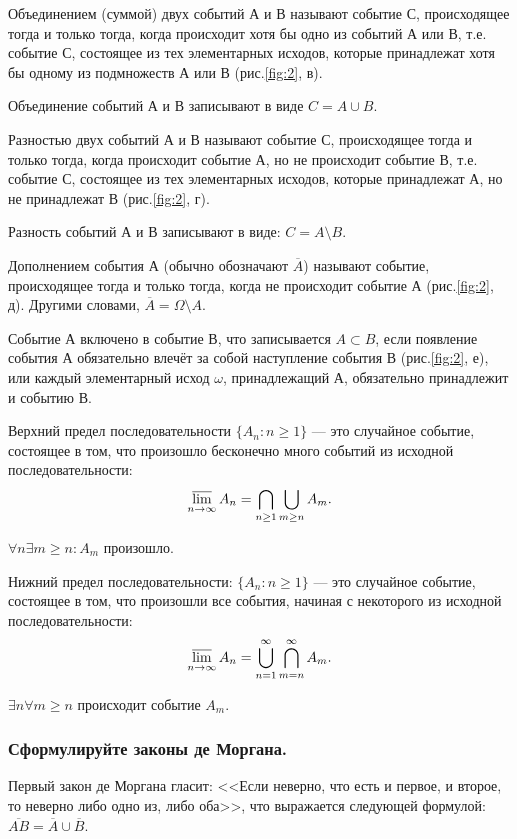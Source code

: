\documentclass{book}
\begin{document}
Объединением (суммой) двух событий А и В называют событие С, происходящее тогда и только тогда, когда происходит хотя бы одно из событий А или В, т.е. событие С, состоящее из тех элементарных исходов, которые принадлежат хотя бы одному из подмножеств А или В (рис.\ref{fig:2}, в).

Объединение событий А и В записывают в виде $C=A\cup B$.

Разностью двух событий А и В называют событие С, происходящее тогда и только тогда, когда происходит событие А, но не происходит событие В, т.е. событие С, состоящее из тех элементарных исходов, которые принадлежат А, но не принадлежат В (рис.\ref{fig:2}, г).

Разность событий А и В записывают в виде: $C=A\setminus B$.

Дополнением события А (обычно обозначают $\overline{A}$) называют событие, происходящее тогда и только тогда, когда не происходит событие А (рис.\ref{fig:2}, д). Другими словами, $\overline{A}=\Omega\setminus A$.

Событие А включено в событие В, что записывается $A\subset B$, если появление события А обязательно влечёт за собой наступление события В (рис.\ref{fig:2}, е), или каждый элементарный исход $\omega$, принадлежащий А, обязательно принадлежит и событию В.

Верхний предел последовательности $\{A_n: n\geq 1\}$ --- это случайное событие, состоящее в том, что произошло бесконечно много событий из исходной последовательности: $$\varlimsup\limits_{n\to\infty}A_n=\bigcap\limits_{n\geq 1}\bigcup\limits_{m\geq n}A_m.$$

$\forall n \exists m\geq n: A_m$ произошло.

Нижний предел последовательности: $\{A_n: n\geq 1\}$ --- это случайное событие, состоящее в том, что произошли все события, начиная с некоторого из исходной последовательности: $$\varlimsup\limits_{n\to\infty}A_n=\bigcup\limits_{n=1}^\infty\bigcap\limits_{m=n}^\infty A_m.$$

$\exists n \forall m\geq n$ происходит событие $A_m$.

\subsubsection*{Сформулируйте законы де Моргана.}

Первый закон де Моргана гласит: <<Если неверно, что есть и первое, и второе, то неверно либо одно из, либо оба>>, что выражается следующей формулой: $\overline{AB}=\overline{A}\cup\overline{B}$.
\end{document}
